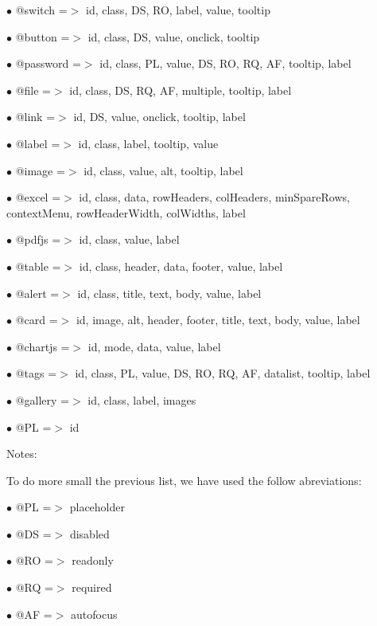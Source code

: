 \documentclass[a4paper]{book}
\begin{document}
\begin{compactitem}
\item[\color{myblue}$\bullet$] @switch      =$>$ id, class, DS, RO, label, value, tooltip
\item[\color{myblue}$\bullet$] @button      =$>$ id, class, DS, value, onclick, tooltip
\item[\color{myblue}$\bullet$] @password    =$>$ id, class, PL, value, DS, RO, RQ, AF, tooltip, label
\item[\color{myblue}$\bullet$] @file        =$>$ id, class, DS, RQ, AF, multiple, tooltip, label
\item[\color{myblue}$\bullet$] @link        =$>$ id, DS, value, onclick, tooltip, label
\item[\color{myblue}$\bullet$] @label       =$>$ id, class, label, tooltip, value
\item[\color{myblue}$\bullet$] @image       =$>$ id, class, value, alt, tooltip, label
\item[\color{myblue}$\bullet$] @excel       =$>$ id, class, data, rowHeaders, colHeaders, minSpareRows, contextMenu, rowHeaderWidth,
                colWidths, label
\item[\color{myblue}$\bullet$] @pdfjs       =$>$ id, class, value, label
\item[\color{myblue}$\bullet$] @table       =$>$ id, class, header, data, footer, value, label
\item[\color{myblue}$\bullet$] @alert       =$>$ id, class, title, text, body, value, label
\item[\color{myblue}$\bullet$] @card        =$>$ id, image, alt, header, footer, title, text, body, value, label
\item[\color{myblue}$\bullet$] @chartjs     =$>$ id, mode, data, value, label
\item[\color{myblue}$\bullet$] @tags        =$>$ id, class, PL, value, DS, RO, RQ, AF, datalist, tooltip, label
\item[\color{myblue}$\bullet$] @gallery     =$>$ id, class, label, images
\item[\color{myblue}$\bullet$] @PL =$>$ id
\end{compactitem}

Notes:

To do more small the previous list, we have used the follow abreviations:

\begin{compactitem}
\item[\color{myblue}$\bullet$] @PL =$>$ placeholder
\item[\color{myblue}$\bullet$] @DS =$>$ disabled
\item[\color{myblue}$\bullet$] @RO =$>$ readonly
\item[\color{myblue}$\bullet$] @RQ =$>$ required
\item[\color{myblue}$\bullet$] @AF =$>$ autofocus
\end{compactitem}
\end{document}
